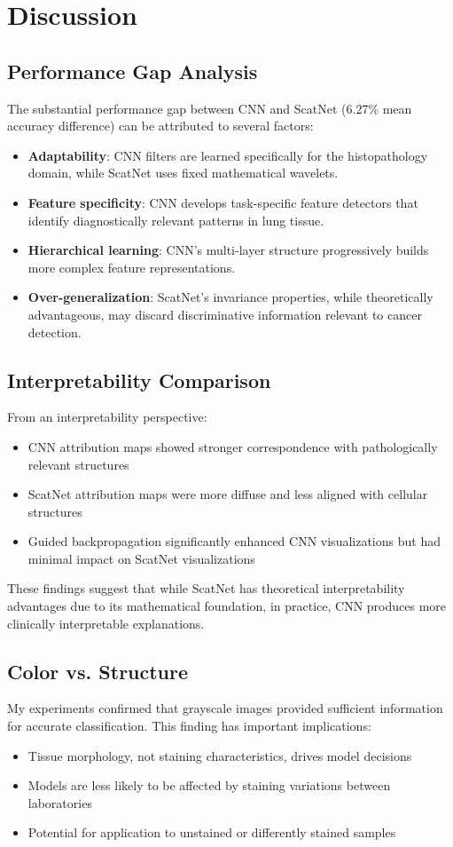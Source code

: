 \documentclass[10pt,twocolumn]{article}
\begin{document}
\section{Discussion}
\subsection{Performance Gap Analysis}
The substantial performance gap between CNN and ScatNet (6.27\% mean accuracy difference) can be attributed to several factors:

\begin{itemize}
    \item \textbf{Adaptability}: CNN filters are learned specifically for the histopathology domain, while ScatNet uses fixed mathematical wavelets.
    \item \textbf{Feature specificity}: CNN develops task-specific feature detectors that identify diagnostically relevant patterns in lung tissue.
    \item \textbf{Hierarchical learning}: CNN's multi-layer structure progressively builds more complex feature representations.
    \item \textbf{Over-generalization}: ScatNet's invariance properties, while theoretically advantageous, may discard discriminative information relevant to cancer detection.
\end{itemize}

\subsection{Interpretability Comparison}
From an interpretability perspective:
\begin{itemize}
    \item CNN attribution maps showed stronger correspondence with pathologically relevant structures
    \item ScatNet attribution maps were more diffuse and less aligned with cellular structures
    \item Guided backpropagation significantly enhanced CNN visualizations but had minimal impact on ScatNet visualizations
\end{itemize}

These findings suggest that while ScatNet has theoretical interpretability advantages due to its mathematical foundation, in practice, CNN produces more clinically interpretable explanations.

\subsection{Color vs. Structure}
My experiments confirmed that grayscale images provided sufficient information for accurate classification. This finding has important implications:
\begin{itemize}
    \item Tissue morphology, not staining characteristics, drives model decisions
    \item Models are less likely to be affected by staining variations between laboratories
    \item Potential for application to unstained or differently stained samples
\end{itemize}
\end{document}
